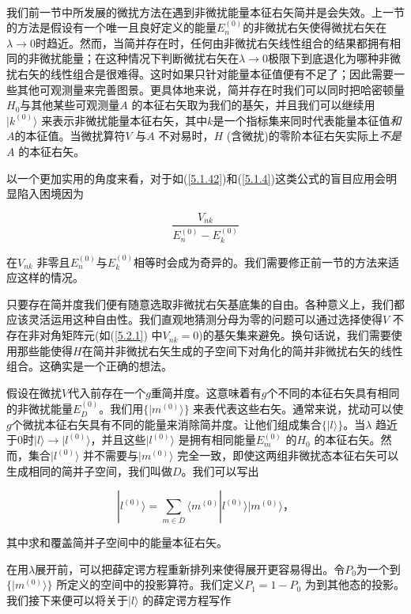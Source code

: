 ﻿\documentclass[UTF8,twoside]{ctexart}
\begin{document}
\

\noindent 我们前一节中所发展的微扰方法在遇到非微扰能量本征右矢简并是会失效。上一节的方法是假设有一个唯一且良好定义的能量$E_n^{(0)}$的非微扰右矢使得微扰右矢在$\lambda\rightarrow0$时趋近。然而，当简并存在时，任何由非微扰右矢线性组合的结果都拥有相同的非微扰能量；在这种情况下判断微扰右矢在$\lambda\rightarrow0$极限下到底退化为哪种非微扰右矢的线性组合是很难得。这时如果只针对能量本征值便有不足了；因此需要一些其他可观测量来完善图景。更具体地来说，简并存在时我们可以同时把哈密顿量$H_0$与其他某些可观测量$A$ 的本征右矢取为我们的基矢，并且我们可以继续用$|k^{(0)}\rangle$ 来表示非微扰能量本征右矢，其中$k$是一个指标集来同时代表能量本征值\emph{和}$A$的本征值。当微扰算符$V$ 与$A$ 不对易时，$H$ (含微扰)的零阶本征右矢实际上\emph{不是}$A$ 的本征右矢。

以一个更加实用的角度来看，对于如(\ref{5.1.42})和(\ref{5.1.4})这类公式的盲目应用会明显陷入困境因为

\begin{equation} \label{5.2.1}
\dfrac{V_{nk}}{E_n^{(0)}-E_k^{(0)}}
\end{equation}

\noindent 在$V_{nk}$ 非零且$E_n^{(0)}$与$E_k^{(0)}$相等时会成为奇异的。我们需要修正前一节的方法来适应这样的情况。

只要存在简并度我们便有随意选取非微扰右矢基底集的自由。各种意义上，我们都应该灵活运用这种自由性。我们直观地猜测分母为零的问题可以通过选择使得$V$ 不存在非对角矩阵元(如(\ref{5.2.1}) 中$V_{nk}=0$)的基矢集来避免。换句话说，我们需要使用那些能使得$H$在简并非微扰右矢生成的子空间下对角化的简并非微扰右矢的线性组合。这确实是一个正确的想法。

假设在微扰$V$代入前存在一个$g$重简并度。这意味着有$g$个不同的本征右矢具有相同的非微扰能量$E_D^{(0)}$。我们用$\{|m^{(0)}\rangle\}$ 来表代表这些右矢。通常来说，扰动可以使$g$个微扰本征右矢具有不同的能量来消除简并度。让他们组成集合$\{|l\rangle\}$。当$\lambda$ 趋近于0时$|l\rangle\rightarrow|l^{(0)}\rangle$，并且这些$|l^{(0)}\rangle$ 是拥有相同能量$E_m^{(0)}$ 的$H_0$ 的本征右矢。然而，集合$|l^{(0)}\rangle$ 并不需要与$|m^{(0)}\rangle$ 完全一致，即使这两组非微扰态本征右矢可以生成相同的简并子空间，我们叫做$D$。我们可以写出

\[|l^{(0)}\rangle=\displaystyle\sum_{m\in D}\langle m^{(0)}|l^{(0)}\rangle|m^{(0)}\rangle\text{，}\]

\noindent 其中求和覆盖简并子空间中的能量本征右矢。

在用$\lambda$展开前，可以把薛定谔方程重新排列来使得展开更容易得出。令$P_0$为一个到$\{|m^{(0)}\rangle\}$ 所定义的空间中的投影算符。我们定义$P_1=1-P_0$ 为到其他态的投影。 我们接下来便可以将关于$|l\rangle$ 的薛定谔方程写作
\end{document}

